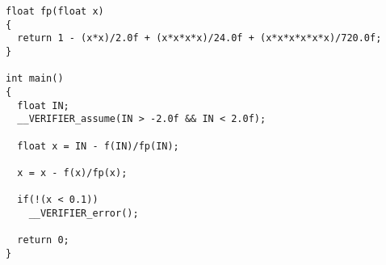 \begin{appendices}
\begin{samepage}
\begin{lstlisting}[c]
float fp(float x)
{
  return 1 - (x*x)/2.0f + (x*x*x*x)/24.0f + (x*x*x*x*x*x)/720.0f;
}

int main()
{
  float IN;
  __VERIFIER_assume(IN > -2.0f && IN < 2.0f);

  float x = IN - f(IN)/fp(IN);

  x = x - f(x)/fp(x);

  if(!(x < 0.1))
    __VERIFIER_error();

  return 0;
}
\end{lstlisting}
\end{samepage}

\end{appendices}
